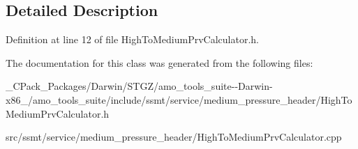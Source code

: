 \subsection{Detailed Description}


Definition at line 12 of file High\+To\+Medium\+Prv\+Calculator.\+h.



The documentation for this class was generated from the following files\+:\begin{DoxyCompactItemize}
\item 
\+\_\+\+C\+Pack\+\_\+\+Packages/\+Darwin/\+S\+T\+G\+Z/amo\+\_\+tools\+\_\+suite-\/-\/\+Darwin-\/x86\+\_/amo\+\_\+tools\+\_\+suite/include/ssmt/service/medium\+\_\+pressure\+\_\+header/High\+To\+Medium\+Prv\+Calculator.\+h\item 
src/ssmt/service/medium\+\_\+pressure\+\_\+header/High\+To\+Medium\+Prv\+Calculator.\+cpp\end{DoxyCompactItemize}
